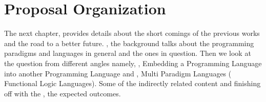 \documentclass[thesis-solanki.tex]{subfiles}
\begin{document}
%






\section{Proposal Organization}

The next chapter,  provides details about the short comings of the previous works and the road to a 
better future. , the background talks about the programming paradigms and languages in general and 
the ones in question. Then we look at the question from different angles namely, ,  Embedding a 
Programming Language into another Programming Language and  , Multi Paradigm Languages (
Functional Logic Languages). Some of the indirectly related content  and finishing off with the 
, the expected outcomes.     

\end{document}
